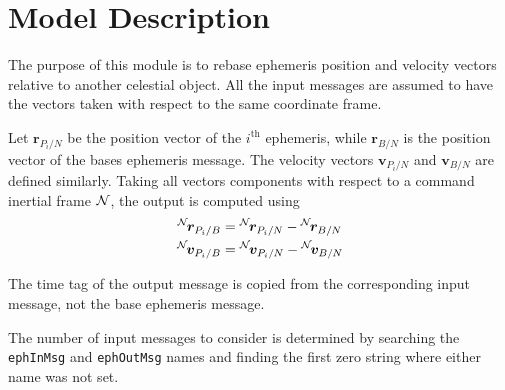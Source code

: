 


\section{Model Description}
The purpose of this module is to rebase ephemeris position and velocity vectors relative to another celestial object.  All the input messages are assumed to have the vectors taken with respect to the same coordinate frame.

Let $\bm r_{P_{i}/N}$ be the position vector of the $i^{\text{th}}$ ephemeris, while $\bm r_{B/N}$ is the position vector of the bases ephemeris message.  The velocity vectors $\bm v_{P_{i}/N}$ and $\bm v_{B/N}$ are defined similarly.  Taking all vectors components with respect to a command inertial frame $\cal N$, the output is computed using
\begin{align}
	\leftexp{N}{\bm r}_{P_{i}/B} &= \leftexp{N}{\bm r}_{P_{i}/N} - \leftexp{N}{\bm r}_{B/N}
	\\
	\leftexp{N}{\bm v}_{P_{i}/B} &= \leftexp{N}{\bm v}_{P_{i}/N} - \leftexp{N}{\bm v}_{B/N}
\end{align}

The time tag of the output message is copied from the corresponding input message, not the base ephemeris message.

The number of input messages to consider is determined by searching the {\tt ephInMsg} and {\tt ephOutMsg} names and finding the first zero string where either name was not set.

